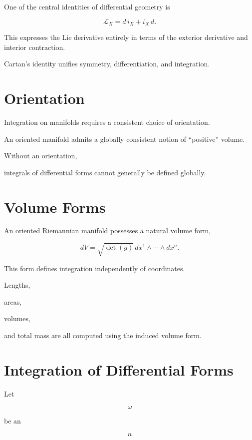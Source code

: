 \documentclass[11pt,fleqn]{book}
\numberwithin{equation}{chapter}
\theoremstyle{plain}
\theoremstyle{definition}
\theoremstyle{remark}
\begin{document}
One of the central identities of differential geometry is

\[
\boxed{
\mathcal L_X
=
d\,i_X
+
i_X\,d.
}
\]

This expresses the Lie derivative entirely in terms of the exterior
derivative and interior contraction.

Cartan's identity unifies symmetry, differentiation, and integration.


\section{Orientation}

Integration on manifolds requires a consistent choice of orientation.

An oriented manifold admits a globally consistent notion of
``positive'' volume.

Without an orientation,

integrals of differential forms cannot generally be defined globally.


\section{Volume Forms}

An oriented Riemannian manifold possesses a natural volume form,

\[
\boxed{
dV
=
\sqrt{\det(g)}
\,
dx^1
\wedge
\cdots
\wedge
dx^n.
}
\]

This form defines integration independently of coordinates.

Lengths,

areas,

volumes,

and total mass are all computed using the induced volume form.


\section{Integration of Differential Forms}

Let

\[
\omega
\]

be an

\[
n
\]
\end{document}
